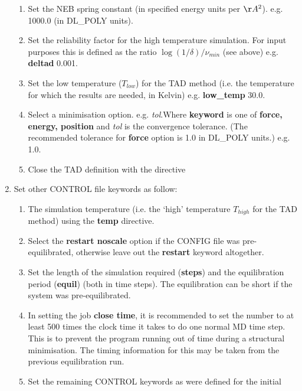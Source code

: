 \begin{enumerate}
\begin{enumerate}
\item Set the NEB spring constant (in specified energy units per $\AA^2$). 
       e.g.  1000.0 (in DL\_POLY units).
\item Set the reliability factor for the high temperature 
 simulation. For input purposes this is defined as the ratio 
 $\log(1/\delta)/\nu_{min}$ (see above) e.g. \newline
 {\bf deltad} 0.001.
\item Set the low temperature ($T_{low}$) for the TAD method (i.e. 
 the temperature for which the results are needed, in Kelvin) e.g. \newline
 {\bf low\_temp} 30.0.
\item Select a minimisation option.  e.g. 
  {\em tol}.\newline Where {\bf keyword} is one of
 {\bf force, energy, position} and {\em tol} is the convergence
 tolerance.  (The recommended tolerance for {\bf force} option is 1.0
 in DL\_POLY units.) e.g.  1.0.
\item Close the TAD definition with the directive 
\end{enumerate}
\item Set other CONTROL file keywords as follow:
\begin{enumerate}
\item The simulation temperature (i.e. the `high' temperature
$T_{high}$ for the TAD method) using the {\bf temp} directive.
\item Select the {\bf restart noscale} option if the CONFIG file was
pre-equilibrated, otherwise leave out the {\bf restart} keyword
altogether.
\item Set the length of the simulation required ({\bf steps}) and 
 the equilibration period ({\bf equil}) (both in time steps). The
equilibration can be short if the system was pre-equilibrated.
\item In setting the job {\bf close time}, it is recommended to set the number
  to at least 500 times the clock time it takes to do one normal MD
  time step. This is to prevent the program running out of time during
  a structural minimisation. The timing information for this may be
  taken from the previous equilibration run.
\item Set the remaining CONTROL keywords as were defined for the initial

\end{enumerate}
\end{enumerate}
